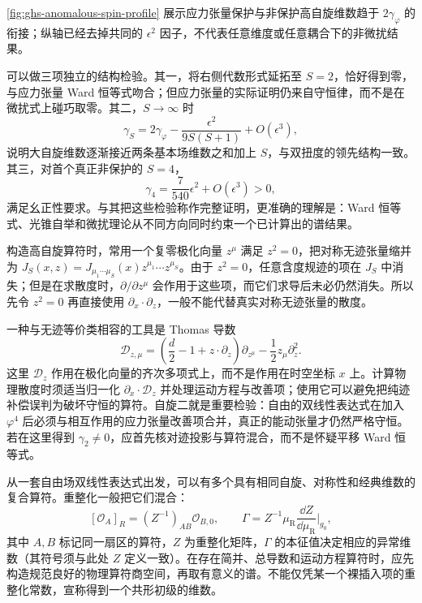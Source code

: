 \cref{fig:ghs-anomalous-spin-profile} 展示应力张量保护与非保护高自旋维数趋于 $2\gamma_\varphi$ 的衔接；纵轴已经去掉共同的 $\epsilon^2$ 因子，不代表任意维度或任意耦合下的非微扰结果。

可以做三项独立的结构检验。其一，将右侧代数形式延拓至 $S=2$，恰好得到零，与应力张量 Ward 恒等式吻合；但应力张量的实际证明仍来自守恒律，而不是在微扰式上碰巧取零。其二，$S\to\infty$ 时
\begin{equation}\label{eq:ghs-wf-higher-spin-large-s}
 \gamma_S=2\gamma_\varphi-\frac{\epsilon^2}{9S(S+1)}
 +O(\epsilon^3),
\end{equation}
说明大自旋维数逐渐接近两条基本场维数之和加上 $S$，与双扭度的领先结构一致。其三，对首个真正非保护的 $S=4$，
\begin{equation}\label{eq:ghs-wf-spin-four}
 \gamma_4=\frac{7}{540}\epsilon^2+O(\epsilon^3)>0,
\end{equation}
满足幺正性要求。与其把这些检验称作完整证明，更准确的理解是：Ward 恒等式、光锥自举和微扰理论从不同方向同时约束一个已计算出的谱结果。


构造高自旋算符时，常用一个复零极化向量 $z^\mu$ 满足 $z^2=0$，把对称无迹张量缩并为 $J_S(x,z)=J_{\mu_1\cdots\mu_S}(x)z^{\mu_1}\cdots z^{\mu_S}$。由于 $z^2=0$，任意含度规迹的项在 $J_S$ 中消失；但是在求散度时，$\partial/\partial z^\mu$ 会作用于这些项，而它们求导后未必仍然消失。所以先令 $z^2=0$ 再直接使用 $\partial_x\cdot\partial_z$，一般不能代替真实对称无迹张量的散度。

一种与无迹等价类相容的工具是 Thomas 导数
\begin{equation}\label{eq:ghs-thomas-derivative}
 \mathscr D_{z,\mu}
 =\left(\frac d2-1+z\cdot\partial_z\right)\partial_{z^\mu}
 -\frac12 z_\mu\partial_z^2.
\end{equation}
这里 $\mathscr D_z$ 作用在极化向量的齐次多项式上，而不是作用在时空坐标 $x$ 上。计算物理散度时须适当归一化 $\partial_x\cdot\mathscr D_z$ 并处理运动方程与改善项；使用它可以避免把纯迹补偿误判为破坏守恒的算符。自旋二就是重要检验：自由的双线性表达式在加入 $\varphi^4$ 后必须与相互作用的应力张量改善项合并，真正的能动张量才仍然严格守恒。若在这里得到 $\gamma_2\ne0$，应首先核对迹投影与算符混合，而不是怀疑平移 Ward 恒等式。


从一套自由场双线性表达式出发，可以有多个具有相同自旋、对称性和经典维数的复合算符。重整化一般把它们混合：
\begin{equation}\label{eq:ghs-spin-mixing-renormalization}
 [\mathcal O_A]_R=(Z^{-1})_{AB}\mathcal O_{B,0},\qquad
 \Gamma=Z^{-1}\mu_{\mathrm R}\frac{\dd Z}{\dd\mu_{\mathrm R}}\bigg|_{g_0},
\end{equation}
其中 $A,B$ 标记同一扇区的算符，$Z$ 为重整化矩阵，$\Gamma$ 的本征值决定相应的异常维数（其符号须与此处 $Z$ 定义一致）。在存在简并、总导数和运动方程算符时，应先构造规范良好的物理算符商空间，再取有意义的谱。不能仅凭某一个裸插入项的重整化常数，宣称得到一个共形初级的维数。

